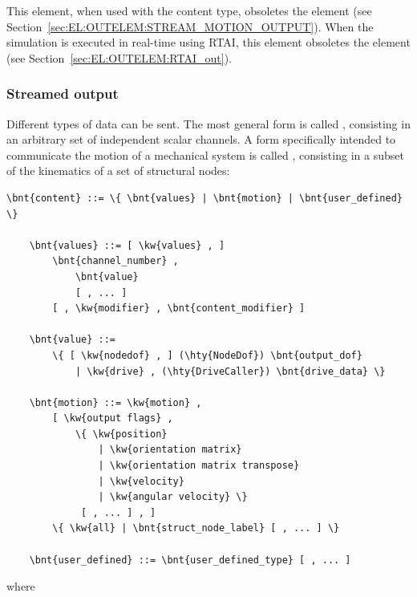 This element, when used with the  content type,
obsoletes the  element
(see Section~\ref{sec:EL:OUTELEM:STREAM_MOTION_OUTPUT}).
When the simulation is executed in real-time using RTAI,
this element obsoletes the  element
(see Section~\ref{sec:EL:OUTELEM:RTAI_out}).



\subsubsection{Streamed output}
\label{sec:EL:OUTELEM:STREAM_OUTPUT:STREAMED_OUTPUT}
Different types of data can be sent.
The most general form is called , consisting
in an arbitrary set of independent scalar channels.
A form specifically intended to communicate the motion
of a mechanical system is called , consisting
in a subset of the kinematics of a set of structural nodes:
\begin{Verbatim}[commandchars=\\\{\}]
    \bnt{content} ::= \{ \bnt{values} | \bnt{motion} | \bnt{user_defined} \}

    \bnt{values} ::= [ \kw{values} , ]
        \bnt{channel_number} ,
            \bnt{value}
            [ , ... ]
        [ , \kw{modifier} , \bnt{content_modifier} ]

    \bnt{value} ::=
        \{ [ \kw{nodedof} , ] (\hty{NodeDof}) \bnt{output_dof}
            | \kw{drive} , (\hty{DriveCaller}) \bnt{drive_data} \}

    \bnt{motion} ::= \kw{motion} ,
        [ \kw{output flags} ,
            \{ \kw{position}
                | \kw{orientation matrix}
                | \kw{orientation matrix transpose}
                | \kw{velocity}
                | \kw{angular velocity} \}
             [ , ... ] , ]
        \{ \kw{all} | \bnt{struct_node_label} [ , ... ] \}

    \bnt{user_defined} ::= \bnt{user_defined_type} [ , ... ]
\end{Verbatim}
where

